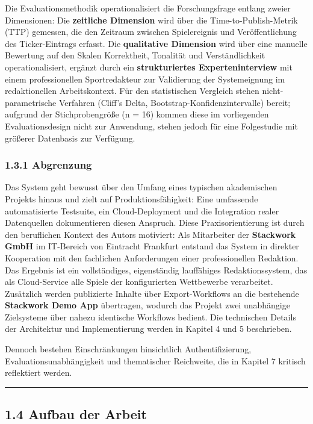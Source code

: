 Die Evaluationsmethodik operationalisiert die Forschungsfrage entlang
zweier Dimensionen: Die \textbf{zeitliche Dimension} wird über die
Time-to-Publish-Metrik (TTP) gemessen, die den Zeitraum zwischen
Spielereignis und Veröffentlichung des Ticker-Eintrags erfasst. Die
\textbf{qualitative Dimension} wird über eine manuelle Bewertung auf den
Skalen Korrektheit, Tonalität und Verständlichkeit operationalisiert,
ergänzt durch ein \textbf{strukturiertes Experteninterview} mit einem
professionellen Sportredakteur zur Validierung der Systemeignung im
redaktionellen Arbeitskontext. Für den statistischen Vergleich stehen
nicht-parametrische Verfahren (Cliff's Delta,
Bootstrap-Konfidenzintervalle) bereit; aufgrund der Stichprobengröße (n
= 16) kommen diese im vorliegenden Evaluationsdesign nicht zur
Anwendung, stehen jedoch für eine Folgestudie mit größerer Datenbasis
zur Verfügung.

\subsubsection{1.3.1 Abgrenzung}\label{abgrenzung}

Das System geht bewusst über den Umfang eines typischen akademischen
Projekts hinaus und zielt auf Produktionsfähigkeit: Eine umfassende
automatisierte Testsuite, ein Cloud-Deployment und die Integration
realer Datenquellen dokumentieren diesen Anspruch. Diese
Praxisorientierung ist durch den beruflichen Kontext des Autors
motiviert: Als Mitarbeiter der \textbf{Stackwork GmbH} im IT-Bereich von
Eintracht Frankfurt entstand das System in direkter Kooperation mit den
fachlichen Anforderungen einer professionellen Redaktion. Das Ergebnis
ist ein vollständiges, eigenständig lauffähiges Redaktionssystem, das
als Cloud-Service alle Spiele der konfigurierten Wettbewerbe
verarbeitet. Zusätzlich werden publizierte Inhalte über Export-Workflows
an die bestehende \textbf{Stackwork Demo App} übertragen, wodurch das
Projekt zwei unabhängige Zielsysteme über nahezu identische Workflows
bedient. Die technischen Details der Architektur und Implementierung
werden in Kapitel 4 und 5 beschrieben.

Dennoch bestehen Einschränkungen hinsichtlich Authentifizierung,
Evaluationsunabhängigkeit und thematischer Reichweite, die in Kapitel 7
kritisch reflektiert werden.

\begin{center}\rule{0.5\linewidth}{0.5pt}\end{center}

\subsection{1.4 Aufbau der Arbeit}\label{aufbau-der-arbeit}

